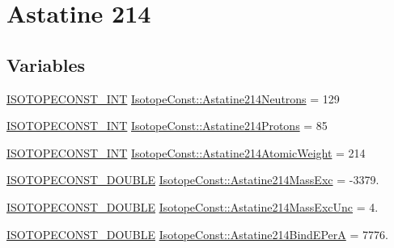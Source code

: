 \hypertarget{group___isotope_const-_astatine-_at214}{}\section{Astatine 214}
\label{group___isotope_const-_astatine-_at214}
\subsection*{Variables}
\begin{DoxyCompactItemize}
\item 
\mbox{\hyperlink{group___isotope_const-_macros_ga5f18360b3e99483a35c32d789e62621c}{I\+S\+O\+T\+O\+P\+E\+C\+O\+N\+S\+T\+\_\+\+I\+NT}} \mbox{\hyperlink{group___isotope_const-_astatine-_at214_ga25a28f4cc25132a6691d04b33948d86b}{Isotope\+Const\+::\+Astatine214\+Neutrons}} = 129
\item 
\mbox{\hyperlink{group___isotope_const-_macros_ga5f18360b3e99483a35c32d789e62621c}{I\+S\+O\+T\+O\+P\+E\+C\+O\+N\+S\+T\+\_\+\+I\+NT}} \mbox{\hyperlink{group___isotope_const-_astatine-_at214_ga0af3c831d3b4cffcf9746b1ca076b9b1}{Isotope\+Const\+::\+Astatine214\+Protons}} = 85
\item 
\mbox{\hyperlink{group___isotope_const-_macros_ga5f18360b3e99483a35c32d789e62621c}{I\+S\+O\+T\+O\+P\+E\+C\+O\+N\+S\+T\+\_\+\+I\+NT}} \mbox{\hyperlink{group___isotope_const-_astatine-_at214_gaa48b4aeca13aa83bd2bcaf7cc5330db5}{Isotope\+Const\+::\+Astatine214\+Atomic\+Weight}} = 214
\item 
\mbox{\hyperlink{group___isotope_const-_macros_ga8f45a7272ce02c0b4c65c44636ed719a}{I\+S\+O\+T\+O\+P\+E\+C\+O\+N\+S\+T\+\_\+\+D\+O\+U\+B\+LE}} \mbox{\hyperlink{group___isotope_const-_astatine-_at214_ga69f27648e7532989df387288bf6dc767}{Isotope\+Const\+::\+Astatine214\+Mass\+Exc}} = -\/3379.
\item 
\mbox{\hyperlink{group___isotope_const-_macros_ga8f45a7272ce02c0b4c65c44636ed719a}{I\+S\+O\+T\+O\+P\+E\+C\+O\+N\+S\+T\+\_\+\+D\+O\+U\+B\+LE}} \mbox{\hyperlink{group___isotope_const-_astatine-_at214_ga622fbe628dde12f384d95571642227a4}{Isotope\+Const\+::\+Astatine214\+Mass\+Exc\+Unc}} = 4.
\item 
\mbox{\hyperlink{group___isotope_const-_macros_ga8f45a7272ce02c0b4c65c44636ed719a}{I\+S\+O\+T\+O\+P\+E\+C\+O\+N\+S\+T\+\_\+\+D\+O\+U\+B\+LE}} \mbox{\hyperlink{group___isotope_const-_astatine-_at214_ga97fa8cc91afa53ac7e18f2e872309c2c}{Isotope\+Const\+::\+Astatine214\+Bind\+E\+PerA}} = 7776.
\item 

\end{DoxyCompactItemize}
